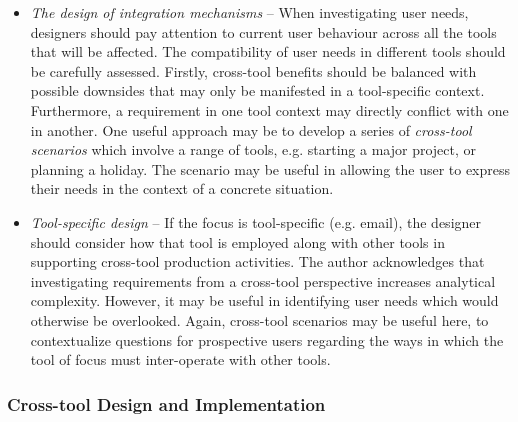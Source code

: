 \begin{itemize}

\item \textit{The design of integration mechanisms} -- When investigating user needs, designers should pay attention to current user behaviour across all the tools that will be affected.  The compatibility of user needs in different tools should be carefully assessed. Firstly, cross-tool benefits should be balanced with possible downsides that may only be manifested in a tool-specific context.  Furthermore, a requirement in one tool context may directly conflict with one in another. One useful approach may be to develop a series of \textit{cross-tool scenarios} which involve a range of tools, e.g. starting a major project, or planning a holiday.  The scenario may be useful in allowing the user to express their needs in the context of a concrete situation.

\item \textit{Tool-specific design} -- If the focus is tool-specific (e.g. email), the designer should consider how that tool is employed along with other tools in supporting cross-tool production activities.  The author acknowledges that investigating requirements from a cross-tool perspective increases analytical complexity.  However, it may be useful in identifying user needs which would otherwise be overlooked.  Again, cross-tool scenarios may be useful here, to contextualize questions for prospective users regarding the ways in which the tool of focus must inter-operate with other tools.

\end{itemize}





\subsubsection{Cross-tool Design and Implementation}


